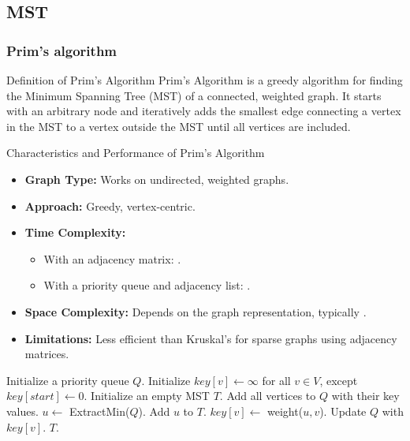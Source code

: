 \newpage
\subsection{MST}
\subsubsection{Prim's algorithm}
\begin{definition}[]{Definition of Prim's Algorithm}
    Prim's Algorithm is a greedy algorithm for finding the Minimum Spanning Tree (MST) of a connected, weighted graph. 
    It starts with an arbitrary node and iteratively adds the smallest edge connecting a vertex in the MST to a vertex outside the MST until all vertices are included.
\end{definition}

\begin{properties}[]{Characteristics and Performance of Prim's Algorithm}
    \begin{itemize}
        \item \textbf{Graph Type:} Works on undirected, weighted graphs.
        \item \textbf{Approach:} Greedy, vertex-centric.
        \item \textbf{Time Complexity:}
              \begin{itemize}
                  \item With an adjacency matrix: .
                  \item With a priority queue and adjacency list: .
              \end{itemize}
        \item \textbf{Space Complexity:} Depends on the graph representation, typically .
        \item \textbf{Limitations:} Less efficient than Kruskal's for sparse graphs using adjacency matrices.
    \end{itemize}
\end{properties}

\begin{algorithm}
    \caption{Prim's Algorithm}
    \begin{algorithmic}[1]
            \State Initialize a priority queue $Q$.
            \State Initialize $key[v] \gets \infty$ for all $v \in V$, except $key[start] \gets 0$.
            \State Initialize an empty MST $T$.
            \State Add all vertices to $Q$ with their key values.
                \State $u \gets$ ExtractMin($Q$).
                \State Add $u$ to $T$.
                        \State $key[v] \gets$ weight($u, v$).
                        \State Update $Q$ with $key[v]$.
                    \EndIf
                \EndFor
            \EndWhile
            \State \Return $T$.
        \EndProcedure
    \end{algorithmic}
\end{algorithm}

